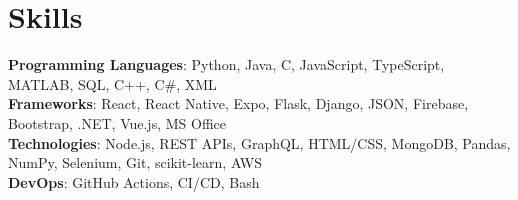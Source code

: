 \section{Skills}
    \begin{itemize}[leftmargin=0.15in, label={}]
	\small{\item{
		\textbf{Programming Languages}{: Python, Java, C, JavaScript, TypeScript, MATLAB, SQL, C++, C\#, XML} \\
		\textbf{Frameworks}{: React, React Native, Expo, Flask, Django, JSON, Firebase, Bootstrap, .NET, Vue.js, MS Office} \\
		\textbf{Technologies}{: Node.js, REST APIs, GraphQL,  HTML/CSS, MongoDB, Pandas, NumPy, Selenium, Git, scikit-learn, AWS} \\
		\textbf{DevOps}{: GitHub Actions, CI/CD, Bash} \\
	}}
    \end{itemize}
